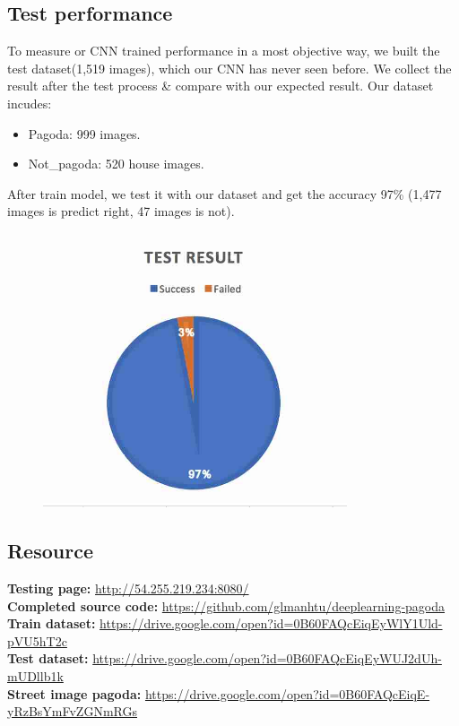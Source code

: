 \documentclass[12pt,a4paper]{article}
\begin{document}
\subsection{Test performance}
To measure or CNN trained performance in a most objective way, we built the test dataset(1,519 images), which our CNN has never seen before. We collect the result after the test process \& compare with our expected result. Our dataset incudes:
\begin{itemize}
\item Pagoda: 999 images.
\item Not\_pagoda: 520 house images.
\end{itemize}
After train model, we test it with our dataset and get the accuracy 97\% (1,477 images is predict right, 47 images is not).
\begin{figure}[H]
\centering
\includegraphics[width=0.8\textwidth]{images/testresult.jpg}
\label{fig:samplepagoda}
\end{figure}

\subsection{Resource}
\textbf{Testing page:} \url{http://54.255.219.234:8080/}\\
\textbf{Completed source code:} \url{https://github.com/glmanhtu/deeplearning-pagoda}\\
\textbf{Train dataset:} \url{https://drive.google.com/open?id=0B60FAQcEiqEyWlY1Uld-pVU5hT2c}\\
\textbf{Test dataset:} \url{https://drive.google.com/open?id=0B60FAQcEiqEyWUJ2dUh-mUDllb1k}\\
\textbf{Street image pagoda: } \url{https://drive.google.com/open?id=0B60FAQcEiqE-yRzBsYmFvZGNmRGs}



\end{document}
